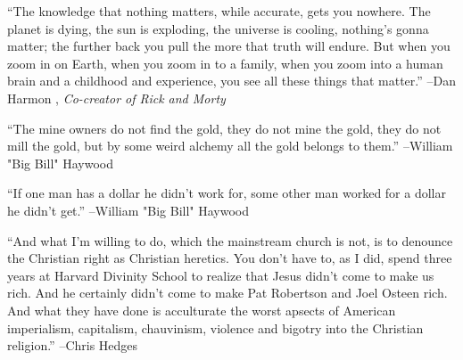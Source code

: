 \documentclass{article}%
\begin{document}
\linebreak%
\vspace{1mm}%
\begin{minipage}{\textwidth}%
\flushleft%
“The knowledge that nothing matters, while accurate, gets you nowhere. The planet is dying, the sun is exploding, the universe is cooling, nothing's gonna matter; the further back you pull the more that truth will endure. But when you zoom in on Earth, when you zoom in to a family, when you zoom into a human brain and a childhood and experience, you see all these things that matter.”%
\linebreak%
\vspace{1mm}%
–Dan Harmon%
, \textit{Co-creator of Rick and Morty}%
\linebreak%
\vspace{1mm}%
\end{minipage}%
\linebreak%
\vspace{1mm}%
\begin{minipage}{\textwidth}%
\flushleft%
“The mine owners do not find the gold, they do not mine the gold, they do not mill the gold, but by some weird alchemy all the gold belongs to them.”%
\linebreak%
\vspace{1mm}%
–William "Big Bill" Haywood%
\linebreak%
\vspace{1mm}%
\end{minipage}%
\linebreak%
\vspace{1mm}%
\begin{minipage}{\textwidth}%
\flushleft%
“If one man has a dollar he didn't work for, some other man worked for a dollar he didn't get.”%
\linebreak%
\vspace{1mm}%
–William "Big Bill" Haywood%
\linebreak%
\vspace{1mm}%
\end{minipage}%
\linebreak%
\vspace{1mm}%
\begin{minipage}{\textwidth}%
\flushleft%
“And what I'm willing to do, which the mainstream church is not, is to denounce the Christian right as Christian heretics. You don't have to, as I did, spend three years at Harvard Divinity School to realize that Jesus didn't come to make us rich. And he certainly didn't come to make Pat Robertson and Joel Osteen rich. And what they have done is acculturate the worst apsects of American imperialism, capitalism, chauvinism, violence and bigotry into the Christian religion.”%
\linebreak%
\vspace{1mm}%
–Chris Hedges%
\linebreak%
\vspace{1mm}%
\end{minipage}%
\end{document}
